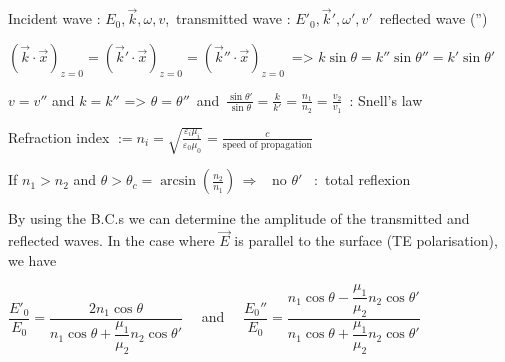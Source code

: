 \begin{squishlist}
\item Incident wave : $E_0, \vec{k}, \omega, v$,\, transmitted wave : $E'_0, \vec{k}', \omega', v'$\, reflected wave ('')


\item $(\vec{k}\cdot\vec{x})_{z=0} = (\vec{k}'\cdot\vec{x})_{z=0} = (\vec{k}''\cdot\vec{x})_{z=0}\, $ => $k\sin\theta = k''\sin\theta'' = k'\sin\theta'$

\item $v = v''$ and $k =k''$ => $\theta = \theta'' \,$ and  $\, \frac{\sin\theta'}{\sin\theta} = \frac{k}{k'} = \frac{n_1}{n_2} = \frac{v_2}{v_1} \, $ : Snell's law\

\item Refraction index $:=n_i=\sqrt{\frac{\varepsilon_i\mu_i}{\varepsilon_0\mu_0}}=\frac{c}{\text{speed of propagation}}$

\item If $n_1 > n_2$ and $\theta > \theta_c = \arcsin\left(\frac{n_2}{n_1}\right) \, \Rightarrow$ \, no $\theta'$ \, :\, total reflexion

\item[] By using the B.C.s we can determine the amplitude of the transmitted and reflected waves. In the case where $\vec{E}$ is parallel to the surface (TE polarisation), we have

\item $\dfrac{E'_0}{E_0} = \dfrac{2n_1\cos\theta}{n_1\cos\theta + \dfrac{\mu_1}{\mu_2}n_2\cos\theta'} \quad $ and $\quad \dfrac{E_0''}{E_0}  = \dfrac{n_1\cos\theta - \dfrac{\mu_1}{\mu_2}n_2\cos\theta'}{n_1\cos\theta + \dfrac{\mu_1}{\mu_2} n_2 \cos\theta'}$
\end{squishlist}
